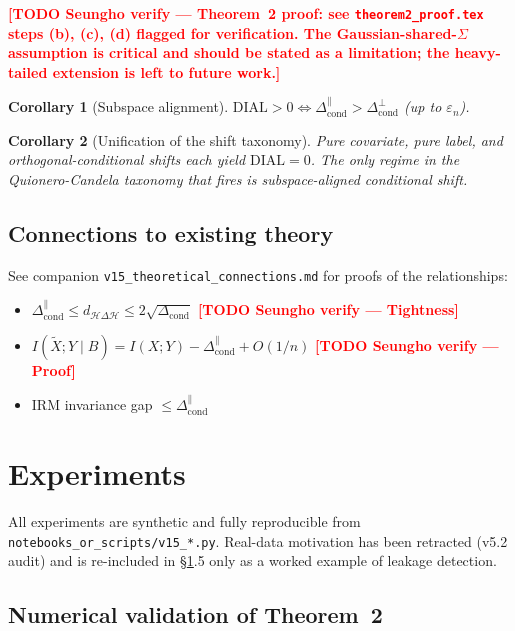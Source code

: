 \documentclass{article}
\newtheorem{corollary}{Corollary}
\newcommand{\dial}{\mathrm{DIAL}}
\newcommand{\TODO}[1]{\textbf{\textcolor{red}{[TODO Seungho verify --- #1]}}}
\begin{document}
\TODO{Theorem~2 proof: see \texttt{theorem2\_proof.tex} steps (b),
(c), (d) flagged for verification. The Gaussian-shared-$\Sigma$ assumption
is critical and should be stated as a limitation; the heavy-tailed
extension is left to future work.}

\begin{corollary}[Subspace alignment]
\label{cor:subspace}
$\dial>0\iff \Delta_{\text{cond}}^{\parallel}>\Delta_{\text{cond}}^{\perp}$
(up to $\varepsilon_n$).
\end{corollary}

\begin{corollary}[Unification of the shift taxonomy]
\label{cor:taxonomy}
Pure covariate, pure label, and orthogonal-conditional shifts each
yield $\dial=0$. The only regime in the Quionero-Candela taxonomy that
fires is \emph{subspace-aligned conditional shift}.
\end{corollary}

\subsection{Connections to existing theory}
See companion \texttt{v15\_theoretical\_connections.md} for proofs of
the relationships:
\begin{itemize}
\item $\Delta_{\text{cond}}^{\parallel}\le d_{\mathcal{H}\Delta\mathcal{H}}\le 2\sqrt{\Delta_{\text{cond}}}$ \TODO{Tightness}
\item $I(\tilde X;Y\mid B)=I(X;Y)-\Delta_{\text{cond}}^{\parallel}+O(1/n)$ \TODO{Proof}
\item IRM invariance gap $\le \Delta_{\text{cond}}^{\parallel}$
\end{itemize}

\section{Experiments}
\label{sec:exp}

All experiments are synthetic and fully reproducible from
\texttt{notebooks\_or\_scripts/v15\_*.py}. Real-data motivation has been
retracted (v5.2 audit) and is re-included in §\ref{sec:exp}.5 only as a
worked example of leakage detection.

\subsection{Numerical validation of Theorem~2}
\end{document}
